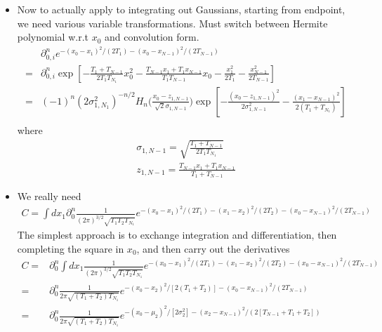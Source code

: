 \begin{itemize}
  \item Now to actually apply to integrating out Gaussians, starting from endpoint,
    we need various variable transformations.  Must switch between Hermite polynomial w.r.t $x_0$
    and convolution form.  
    \begin{align}
      & \partial_{0,i}^n e^{-(x_0-x_1)^2/(2T_1)-(x_0-x_{N-1})^2/(2T_{N-1})}\nonumber\\
      =& 
     \partial_{0,i}^n \exp\left[-\frac{T_1+T_{N-1}}{2T_1T_{N_1}}x_0^2-\frac{T_{N-1}x_1+T_1x_{N-1}}{T_1T_{N-1}}x_0
       -\frac{x_1^2}{2T_1}-\frac{x_{N-1}^2}{2T_{N-1}}\right]\\
     =&(-1)^n \left(2\sigma^2_{1,N_1}\right)^{-n/2}
     H_n\bigg(\frac{x_0-z_{1,N-1}}{\sqrt{2}\sigma_{1,N-1}}\bigg)
       \exp\left[-\frac{(x_0-z_{1,N-1})^2}{2\sigma^2_{1,N-1}}-\frac{(x_1-x_{N-1})^2}{2(T_1+T_{N_1})}\right]\\
    \end{align}
    where 
    \begin{gather}
      \sigma_{1,N-1} = \sqrt{\frac{T_1+T_{N-1}}{2T_1T_{N_1}}}\\
      z_{1,N-1} = \frac{T_{N-1}x_1+T_1x_{N-1}}{T_1+T_{N-1}}
    \end{gather}
  \item We really need 
    \begin{align}
      C=\int dx_1 \partial_0^n \frac{1}{(2\pi)^{3/2}\sqrt{T_1T_2T_{N_1}}}e^{-(x_0-x_1)^2/(2T_1)-(x_1-x_2)^2/(2T_2)-(x_0-x_{N-1})^2/(2T_{N-1})}
    \end{align}
    The simplest approach is to exchange integration and differentiation, then completing the square in $x_0$,
    and then carry out the derivatives
    \begin{align}
      C=&\partial_0^n\int dx_1  \frac{1}{(2\pi)^{3/2}\sqrt{T_1T_2T_{N_1}}}e^{-(x_0-x_1)^2/(2T_1)-(x_1-x_2)^2/(2T_2)-(x_0-x_{N-1})^2/(2T_{N-1})}\\
      =&\partial_0^n \frac{1}{2\pi\sqrt{(T_1+T_2)T_{N_1}}}e^{-(x_0-x_2)^2/[2(T_1+T_2)]-(x_0-x_{N-1})^2/(2T_{N-1})}\\
      =&\partial_0^n \frac{1}{2\pi\sqrt{(T_1+T_2)T_{N_1}}}e^{-(x_0-\mu_2)^2/[2\sigma_2^2]-(x_2-x_{N-1})^2/(2[T_{N-1}+T_1+T_2])}\\

\end{align}
\end{itemize}
